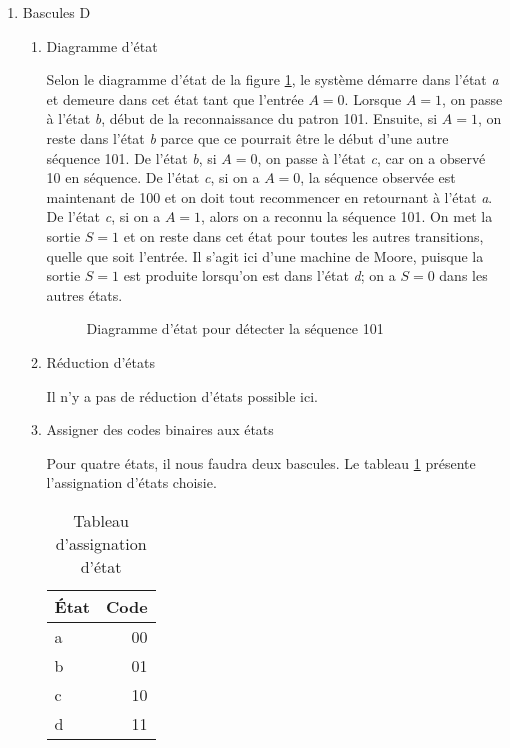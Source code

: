 \documentclass[letter, oneside]{book}
\begin{document}
\begin{enumerate}
\item Bascules D
\label{sec:orgde4883a}

\begin{enumerate}
\item Diagramme d'état
\label{sec:org83d5b58}

Selon le diagramme d'état de la figure \ref{fig:orga357842}, le
système démarre dans l'état \emph{a} et demeure dans cet état tant que
l'entrée \(A=0\). Lorsque \(A=1\), on passe à l'état \emph{b}, début de la
reconnaissance du patron 101. Ensuite, si \(A=1\), on reste dans
l'état \emph{b} parce que ce pourrait être le début d'une autre
séquence 101. De l'état \emph{b}, si \(A=0\), on passe à l'état \emph{c}, car on
a observé 10 en séquence. De l'état \emph{c}, si on a \(A=0\), la séquence
observée est maintenant de 100 et on doit tout recommencer en
retournant à l'état \emph{a}.  De l'état \emph{c}, si on a \(A=1\), alors on a
reconnu la séquence 101. On met la sortie \(S=1\) et on reste dans cet
état pour toutes les autres transitions, quelle que soit l'entrée. Il
s'agit ici d'une machine de Moore, puisque la sortie \(S=1\) est
produite lorsqu'on est dans l'état \emph{d}; on a \(S=0\) dans les autres
états.

\begin{figure}[htbp]
\centering

\caption{\label{fig:orga357842}Diagramme d'état pour détecter la séquence 101}
\end{figure}


\item Réduction d'états
\label{sec:org743f17e}

Il n'y a pas de réduction d'états possible ici.

\item Assigner des codes binaires aux états
\label{sec:orgce34f15}

Pour quatre états, il nous faudra deux bascules.  Le tableau
   \ref{tab:orgb46cd1b} présente l'assignation d'états choisie.

\begin{table}[htbp]
\caption{\label{tab:orgb46cd1b}Tableau d'assignation d'état}
\centering
\begin{tabular}{lr}
État & Code\\[0pt]
\hline
a & 00\\[0pt]
b & 01\\[0pt]
c & 10\\[0pt]
d & 11\\[0pt]
\end{tabular}
\end{table}



\end{enumerate}
\end{enumerate}
\end{document}
